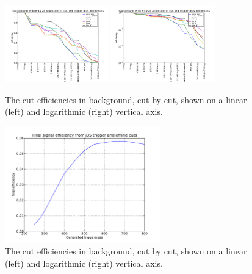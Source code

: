 \begin{figure}
	\includegraphics[width=0.4\textwidth]{TriggerCuts/cut_efficiencies_j35_background.pdf}	
	\includegraphics[width=0.4\textwidth]{TriggerCuts/cut_efficiencies_logy_j35_background.pdf}	
    \caption{The cut efficiencies in background, cut by cut, shown on a linear (left) and logarithmic (right) vertical axis. \label{fig:background_eff_cutflow}}
\end{figure}



\begin{figure}
	\includegraphics[width=0.6\textwidth]{TriggerCuts/final_efficiency_vs_mass_j35.pdf}	
    \caption{The cut efficiencies in background, cut by cut, shown on a linear (left) and logarithmic (right) vertical axis. \label{fig:final_eff_vs_mass}}
\end{figure}







